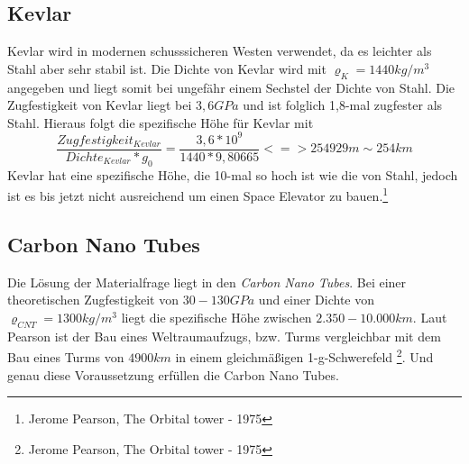 \documentclass[a4paper, 10pt]{report}
\begin{document}
\subsection{Kevlar}
Kevlar wird in modernen schusssicheren Westen verwendet, da es leichter als Stahl aber sehr stabil ist. Die Dichte von Kevlar wird mit $\varrho_K = 1440 kg/m^3$ angegeben und liegt somit bei ungefähr einem Sechstel der Dichte von Stahl. Die Zugfestigkeit von Kevlar liegt bei $3,6 GPa$ und ist folglich 1,8-mal zugfester als Stahl. Hieraus folgt die spezifische Höhe für Kevlar mit
\begin{equation}
\frac{Zugfestigkeit_{Kevlar}}{Dichte_{Kevlar}*g_0} = \frac{3,6*10^9}{1440*9,80665}
<=> 254 929 m \sim 254 km 
\end{equation}
Kevlar hat eine spezifische Höhe, die 10-mal so hoch ist wie die von Stahl, jedoch ist es bis jetzt nicht ausreichend um einen Space Elevator zu bauen.\footnote{Jerome Pearson, The Orbital tower - 1975}
\subsection{Carbon Nano Tubes}
Die Lösung der Materialfrage liegt in den \textsl{Carbon Nano Tubes}.
Bei einer theoretischen Zugfestigkeit von $30 - 130 GPa$ und einer Dichte von $\varrho_{CNT} = 1300 kg/m^3$ liegt die spezifische Höhe zwischen $2.350 - 10.000 km$. Laut Pearson ist der Bau eines Weltraumaufzugs, bzw. Turms vergleichbar mit dem Bau eines Turms von $4900 km$ in einem gleichmäßigen 1-g-Schwerefeld \footnote{Jerome Pearson, The Orbital tower - 1975}. Und genau diese Voraussetzung erfüllen die Carbon Nano Tubes.
\end{document}
